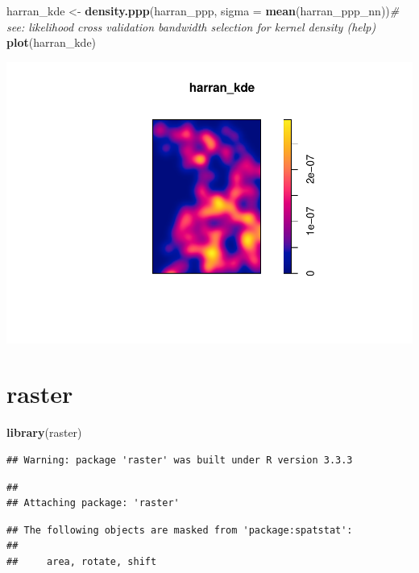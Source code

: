 \documentclass[]{article}
\newenvironment{Shaded}{\begin{snugshade}}{\end{snugshade}}
\newcommand{\KeywordTok}[1]{\textcolor[rgb]{0.13,0.29,0.53}{\textbf{{#1}}}}
\newcommand{\DataTypeTok}[1]{\textcolor[rgb]{0.13,0.29,0.53}{{#1}}}
\newcommand{\StringTok}[1]{\textcolor[rgb]{0.31,0.60,0.02}{{#1}}}
\newcommand{\CommentTok}[1]{\textcolor[rgb]{0.56,0.35,0.01}{\textit{{#1}}}}
\newcommand{\NormalTok}[1]{{#1}}
\begin{document}
\begin{Shaded}
\begin{Highlighting}[]
\NormalTok{harran_kde <-}\StringTok{ }\KeywordTok{density.ppp}\NormalTok{(harran_ppp, }\DataTypeTok{sigma =} \KeywordTok{mean}\NormalTok{(harran_ppp_nn))}\CommentTok{# see: likelihood cross validation bandwidth selection for kernel density (help)}
\KeywordTok{plot}\NormalTok{(harran_kde)}
\end{Highlighting}
\end{Shaded}

\includegraphics{HarranPlain_files/figure-latex/unnamed-chunk-5-1.pdf}

\section{raster}\label{raster}

\begin{Shaded}
\begin{Highlighting}[]
\KeywordTok{library}\NormalTok{(raster)}
\end{Highlighting}
\end{Shaded}

\begin{verbatim}
## Warning: package 'raster' was built under R version 3.3.3
\end{verbatim}

\begin{verbatim}
## 
## Attaching package: 'raster'
\end{verbatim}

\begin{verbatim}
## The following objects are masked from 'package:spatstat':
## 
##     area, rotate, shift
\end{verbatim}
\end{document}
